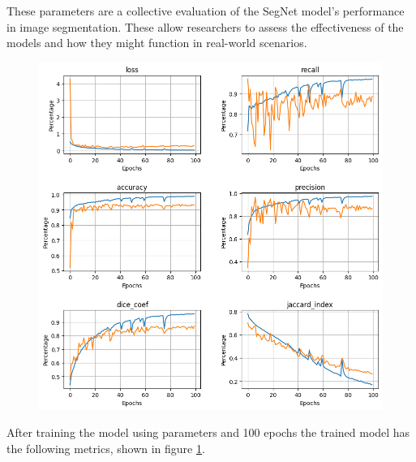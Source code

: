 These parameters are a collective evaluation of the SegNet model's performance in image segmentation. These allow researchers to assess the effectiveness of the models and how they might function in real-world scenarios.

\begin{figure}[]
    \centering
    \includegraphics[scale=0.7]{images/segmentation/SegNet-results.png}
    \caption{}\label{SegNet-results}
\end{figure}

After training the model using parameters and 100 epochs the trained model has the following metrics, shown in figure \ref{SegNet-results}.

